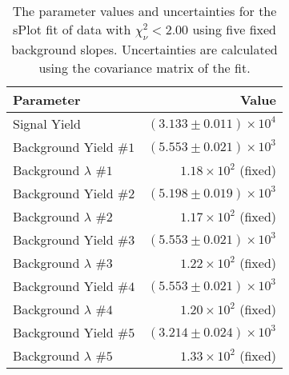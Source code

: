 
\begin{table}[ht]
    \begin{center}
        \begin{tabular}{lr}\toprule
            Parameter & Value \\\midrule
            Signal Yield & $(3.133 \pm 0.011) \times 10^{4}$ \\
            Background Yield $\#1$ & $(5.553 \pm 0.021) \times 10^{3}$ \\
            Background $\lambda$ $\#1$ & $1.18 \times 10^{2}$ (fixed) \\
            Background Yield $\#2$ & $(5.198 \pm 0.019) \times 10^{3}$ \\
            Background $\lambda$ $\#2$ & $1.17 \times 10^{2}$ (fixed) \\
            Background Yield $\#3$ & $(5.553 \pm 0.021) \times 10^{3}$ \\
            Background $\lambda$ $\#3$ & $1.22 \times 10^{2}$ (fixed) \\
            Background Yield $\#4$ & $(5.553 \pm 0.021) \times 10^{3}$ \\
            Background $\lambda$ $\#4$ & $1.20 \times 10^{2}$ (fixed) \\
            Background Yield $\#5$ & $(3.214 \pm 0.024) \times 10^{3}$ \\
            Background $\lambda$ $\#5$ & $1.33 \times 10^{2}$ (fixed) \\\bottomrule
        \end{tabular}
        \caption{The parameter values and uncertainties for the sPlot fit of data with $\chi^2_\nu < 2.00$ using five fixed background slopes. Uncertainties are calculated using the covariance matrix of the fit.}\label{tab:splot-fit-results-chisqdof-2.00-fixed-5}
    \end{center}
\end{table}
